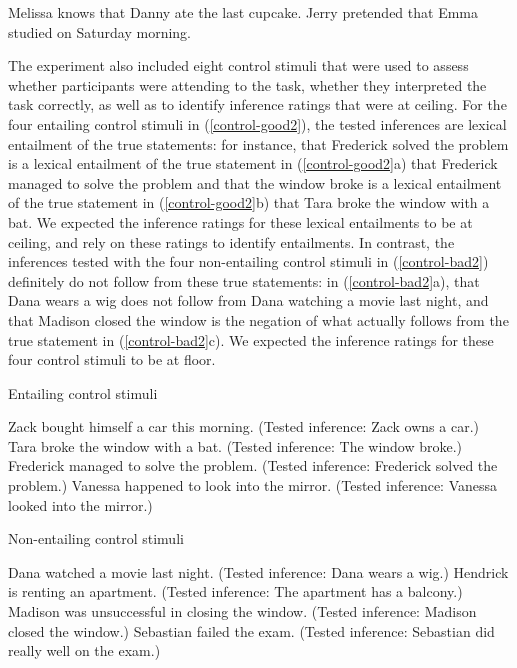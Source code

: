 \documentclass[11pt,fleqn]{article}
\newcommand{\6}{\mbox{$[\hspace*{-.6mm}[$}}
\newcommand{\9}{\mbox{$]\hspace*{-.6mm}]$}}
\begin{document}
\begin{exe}
\ex\label{stims2}
\begin{xlist}
 Melissa knows that Danny ate the last cupcake.
 Jerry pretended that Emma studied on Saturday morning.
\end{xlist}
\end{exe}

The experiment also included eight control stimuli that were used to assess whether participants were attending to the task, whether they interpreted the task correctly, as well as to identify inference ratings that were at ceiling. For the four entailing control stimuli in (\ref{control-good2}), the tested inferences are lexical entailment of the true statements: for instance, that Frederick solved the problem is a lexical entailment of the true statement in (\ref{control-good2}a) that Frederick managed to solve the problem and that the window broke is a lexical entailment of the true statement in (\ref{control-good2}b) that Tara broke the window with a bat. We expected the inference ratings for these lexical entailments to be at ceiling, and rely on these ratings to identify entailments. In contrast, the inferences tested with the four non-entailing control stimuli in (\ref{control-bad2}) definitely do not follow from these true statements: in (\ref{control-bad2}a), that Dana wears a wig does not follow from Dana watching a movie last night, and that Madison closed the window is the negation of what actually follows from the true statement in (\ref{control-bad2}c). We expected the inference ratings for these four control stimuli to be at floor.

\begin{exe}
\ex\label{control-good2} Entailing control stimuli
\begin{xlist}
 Zack bought himself a car this morning. (Tested inference: Zack owns a car.)
 Tara broke the window with a bat. (Tested inference: The window broke.)
 Frederick managed to solve the problem. (Tested inference: Frederick solved the problem.)
 Vanessa happened to look into the mirror. (Tested inference: Vanessa looked into the mirror.)
\end{xlist}
\ex\label{control-bad2} Non-entailing control stimuli
\begin{xlist}
 Dana watched a movie last night. (Tested inference: Dana wears a wig.)
 Hendrick is renting an apartment. (Tested inference: The apartment has a balcony.)
 Madison was unsuccessful in closing the window. (Tested inference:  Madison closed the window.)
 Sebastian failed the exam. (Tested inference: Sebastian did really well on the exam.)
\end{xlist}
\end{exe}
\end{document}
